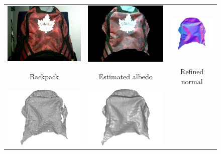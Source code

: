 \begin{figure}[!ht]
\centering
\setlength{\tabcolsep}{0.2em} %
 {\renewcommand{\arraystretch}{0.9}%
\begin{tabular}{c| c c}
   \includegraphics[height = 0.25\linewidth]{figures/methodology/robust_backpack_rgb.png}&
   \includegraphics[height = 0.25\linewidth]{figures/methodology/robust_backpack_rho.png} &
   \includegraphics[height = 0.25\linewidth]{figures/methodology/robust_backpack_normal.png} \\
   {Backpack} & {Estimated albedo} & {Refined normal}\\
   \includegraphics[height = 0.25\linewidth]{figures/methodology/robust_backpack_shape_init.pdf}&
   \includegraphics[height = 0.25\linewidth]{figures/methodology/robust_backpack_shape_smooth.pdf}&

\end{tabular}}
\end{figure}
